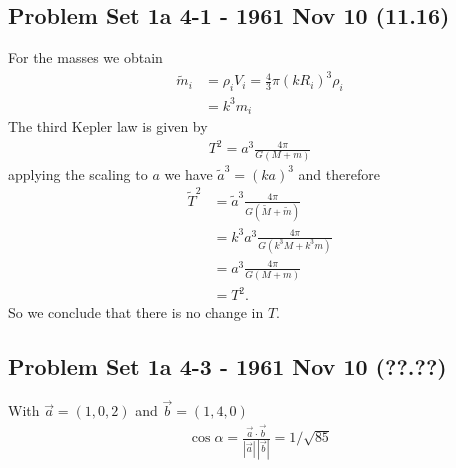 \documentclass[../main.tex]{subfiles}
\begin{document}
\subsection{Problem Set 1a 4-1 - 1961 Nov 10 (11.16)}
For the masses we obtain
\begin{align}
\widetilde{m}_i
&=\rho_i V_i=\frac{4}{3}\pi (kR_i)^3\rho_i\\
&=k^3m_i
\end{align}
The third Kepler law is given by
\begin{align}
T^2=a^3\frac{4\pi}{G(M+m)}
\end{align}
applying the scaling to $a$ we have $\widetilde{a}^3=(ka)^3$ and therefore
\begin{align}
\widetilde{T}^2
&=\widetilde{a}^3\frac{4\pi}{G(\widetilde{M}+\widetilde{m})}\\
&=k^3a^3\frac{4\pi}{G(k^3M+k^3m)}\\
&=a^3\frac{4\pi}{G(M+m)}\\
&=T^2.
\end{align}
So we conclude that there is no change in $T$. 

\subsection{Problem Set 1a 4-3 - 1961 Nov 10 (??.??)}
With $\vec{a}=(1,0,2)$ and $\vec{b}=(1,4,0)$
\begin{align}
\cos\alpha=\frac{\vec{a}\cdot\vec{b}}{|\vec{a}|\,|\vec{b}|}
=1/\sqrt{85}
\end{align}
\end{document}
